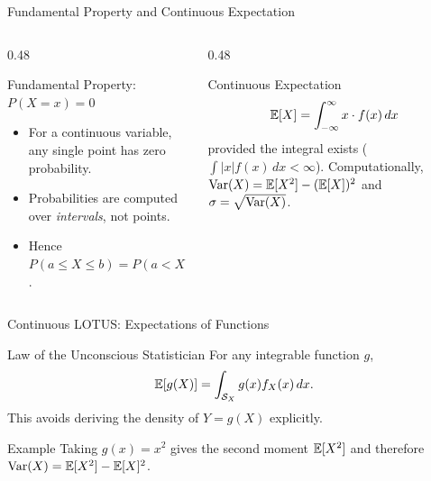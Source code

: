 \documentclass[aspectratio=169,xcolor={dvipsnames,table}]{beamer}
\begin{document}
\begin{frame}{Fundamental Property and Continuous Expectation}
	\vspace{-0.15cm}
	\begin{columns}[T]
		\begin{column}{0.48\textwidth}
			\begin{alertblock}{Fundamental Property: $P(X = x) = 0$}
				\footnotesize
				\begin{itemize}\itemsep=0.05cm
					\item For a continuous variable, any single point has zero probability.
					\item Probabilities are computed over \emph{intervals}, not points.
					\item Hence $P(a \le X \le b) = P(a < X \le b) = P(a \le X < b) = P(a < X < b)$.
				\end{itemize}
			\end{alertblock}
		\end{column}
		\begin{column}{0.48\textwidth}
			\begin{block}{Continuous Expectation}
				\footnotesize
				$$\mathbb{E}[X] = \int_{-\infty}^{\infty} x \cdot f(x)\,dx$$
				provided the integral exists ($\int |x| f(x)\,dx < \infty$). Computationally, $\operatorname{Var}(X) = \mathbb{E}[X^{2}] - (\mathbb{E}[X])^{2}$ and $\sigma = \sqrt{\operatorname{Var}(X)}$.
			\end{block}
		\end{column}
	\end{columns}
\end{frame}

\begin{frame}{Continuous LOTUS: Expectations of Functions}
\scriptsize
\begin{block}{Law of the Unconscious Statistician}
For any integrable function $g$,
\[
\mathbb{E}[g(X)]=\int_{\mathcal{S}_X}g(x)f_X(x)\,dx.
\]
This avoids deriving the density of $Y=g(X)$ explicitly.
\end{block}
\begin{exampleblock}{Example}
Taking $g(x)=x^2$ gives the second moment $\mathbb{E}[X^2]$ and therefore
$\operatorname{Var}(X)=\mathbb{E}[X^2]-\mathbb{E}[X]^2$.
\end{exampleblock}
\end{frame}
\end{document}
